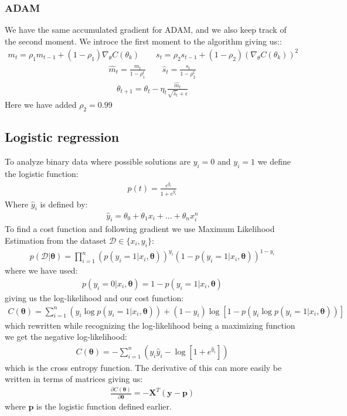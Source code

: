 \documentclass[11pt]{article}
\begin{document}
\subsubsection*{ADAM}
We have the same accumulated gradient for ADAM, and we also keep track of the second moment. We introce the first moment to the algorithm giving us::
\begin{align*}
    m_t = \rho_1 m_{t-1} + (1-\rho_1)\nabla_\theta C(\theta_k) \quad\quad s_t = \rho_2 s_{t-1} + (1- \rho_2)(\nabla_\theta C(\theta_k))^2
\end{align*}
\begin{align*}
    \hat{m}_t = \frac{m_t }{1-\rho_1^t} \quad\quad \hat{s}_t = \frac{s_t }{1- \rho_2^t}
\end{align*}
\begin{align*}
    \theta_{t+1} = \theta_t - \eta_t \frac{\hat{m}_t}{\sqrt{\hat{s}_t} + \epsilon }
\end{align*}
Here we have added $\rho_2=0.99$
\subsection{Logistic regression}
To analyze binary data where possible solutions are $y_i=0$ and $y_i=1$ we define the logistic function:
\begin{align*}
    p(t) =  \frac{e^{\hat{y}_i}}{1+e^{\hat{y}_i}}
\end{align*}
Where $\hat{y}_i$ is defined by:
\begin{align*}
    \hat{y}_i = \theta_0 + \theta_1 x_i +...+ \theta_n x_i^n
\end{align*}
To find a cost function and following gradient we use Maximum Likelihood Estimation from the dataset $\mathcal{D} \in \{x_i, y_i\}$:
\begin{align*}
    p(\mathcal{D}|\boldsymbol{\theta}) = \prod_{i=1}^n (p(y_i = 1|x_i,\boldsymbol{\theta}))^{y_i}\left( 1- p(y_i = 1 | x_i, \boldsymbol{\theta})\right)^{1-y_i}
\end{align*}
where we have used:
\begin{align*}
    p(y_i=0|x_i, \boldsymbol{\theta} ) = 1 - p(y_i=1 | x_i, \boldsymbol{\theta})
\end{align*}
giving us the log-likelihood and our cost function:
\begin{align*}
    C(\boldsymbol{\theta}) = \sum_{i=1}^n (y_i \log p(y_i =1 | x_i, \boldsymbol{\theta})) + (1- y_i) \log [1 - p(y_i \log p(y_i =1 | x_i, \boldsymbol{\theta}))]
\end{align*}
which rewritten while recognizing the log-likelihood being a maximizing function we get the negative log-likelihood:
\begin{align*}
    C(\boldsymbol{\theta}) = -\sum_{i=1}^n (y_i \hat{y}_i - \log [1 + e^{\hat{y}_i}])
\end{align*}
which is the cross entropy function.
The derivative of this can more easily be written in terms of matrices giving us:
\begin{align*}
    \frac{\partial C(\boldsymbol{\theta})}{\partial \boldsymbol{\theta}} = - \boldsymbol{X}^T (\boldsymbol{y}- \boldsymbol{p})
\end{align*}
where $\boldsymbol{p}$ is the logistic function defined earlier.
\end{document}
